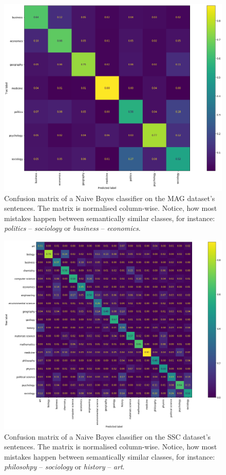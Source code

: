 \begin{figure}
    \centering
    \includegraphics[width=0.8\linewidth]{figures/confusion-matrix.png}
    \caption{Confusion matrix of a Naive Bayes classifier on the MAG dataset's sentences. The matrix is normalised column-wise. Notice, how most mistakes happen between semantically similar classes, for instance: \textit{politics} -- \textit{sociology} or \textit{business} -- \textit{economics}.}
    \label{fig:mag-confusion}
\end{figure}

\begin{figure}
    \centering
    \includegraphics[width=\linewidth]{figures/ss-confusion.png}
    \caption{Confusion matrix of a Naive Bayes classifier on the SSC dataset's sentences. The matrix is normalised column-wise. Notice, how most mistakes happen between semantically similar classes, for instance:  \textit{philosohpy} -- \textit{sociology} or \textit{history} -- \textit{art}.}
    \label{fig:ss-confusion}
\end{figure}

